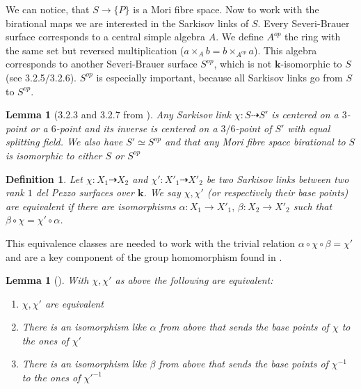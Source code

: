 \documentclass[12pt, oneside, reqno]{amsart}
\newtheorem{lemma}[theorem]{Lemma}
\newtheorem{definition}[theorem]{Definition}
\begin{document}
\noindent
We can notice, that $S \rightarrow \{ P\}$ is a Mori fibre space. Now to work with the birational maps we are interested in the Sarkisov links of $S$. Every Severi-Brauer surface corresponds to a central simple algebra $A$. We define $A^{op}$ the ring with the same set but reversed multiplication ($a \times_A b = b \times_{A^{op}} a$). This algebra corresponds to another Severi-Brauer surface $S^{op}$, which is not $\textbf{k}$-isomorphic to $S$ (see \cite{BSY} 3.2.5/3.2.6). $S^{op}$ is especially important, because all Sarkisov links go from $S$ to $S^{op}$. 
\begin{lemma}[3.2.3 and 3.2.7 from \cite{BSY}] \label{Links36}
    Any Sarkisov link $\chi: S \dashrightarrow S'$ is centered on a $3$-point or a $6$-point and its inverse is centered on a $3/6$-point of $S'$ with equal splitting field. We also have $S' \simeq S^{op}$ and that any Mori fibre space birational to $S$ is isomorphic to either $S$ or $S^{op}$
\end{lemma}
\begin{definition}
    Let $\chi : X_1 \dashrightarrow X_2$ and $\chi':X'_1 \dashrightarrow X'_2$ be two Sarkisov links between two rank $1$ del Pezzo surfaces over $\textbf{k}$. We say $\chi, \chi'$ (or respectively their base points) are equivalent if there are isomorphisms $\alpha : X_1 \rightarrow X'_1, \, \beta : X_2 \rightarrow X'_2$ such that $\beta \circ \chi = \chi' \circ \alpha$.
\end{definition}
\noindent
This equivalence classes are needed to work with the trivial relation $\alpha \circ \chi \circ \beta = \chi'$ and are a key component of the group homomorphism found in \cite{BSY}.
\begin{lemma} [{\cite[Lemma 3.3.2]{BSY}}]
    With $\chi, \chi'$ as above the following are equivalent:
    \begin{enumerate}
        \item[(1)] $\chi, \chi'$ are equivalent
        \item[(2)] There is an isomorphism like $\alpha$ from above that sends the base points of $\chi$ to the ones of $\chi'$
        \item[(3)] There is an isomorphism like $\beta$ from above that sends the base points of $\chi^{-1}$ to the ones of $\chi'^{-1}$
    \end{enumerate}
\end{lemma}
\end{document}
